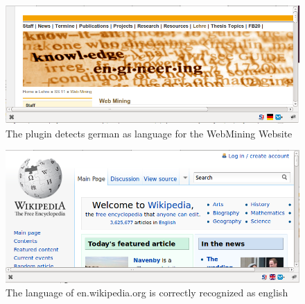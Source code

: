 \begin{frame}[c]
\begin{figure}[htp]
\begin{center}
  \includegraphics[scale=0.4]{../task05/ke_homepage.png} 
  \caption{The plugin detects german as language for the WebMining Website}
  \label{f:keHomepage}
\end{center}
\end{figure}
	
	
\end{frame}

\begin{frame}[c]
\begin{figure}[htp]
\begin{center}
  \includegraphics[scale=0.4]{../task05/wikipedia_homepage.png} 
  \caption{The language of en.wikipedia.org is correctly recognized as english}
  \label{f:wpHomepage}
\end{center}
\end{figure}
	
\end{frame}

